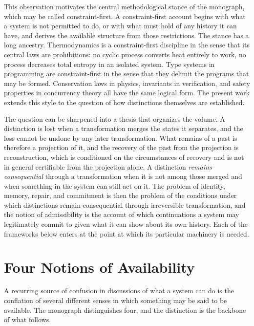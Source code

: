 \documentclass[11pt,twoside,openright]{book}
\theoremstyle{plain}
\theoremstyle{definition}
\theoremstyle{remark}
\begin{document}
This observation motivates the central methodological stance of the monograph, which may be called constraint-first. A constraint-first account begins with what a system is not permitted to do, or with what must hold of any history it can have, and derives the available structure from those restrictions. The stance has a long ancestry. Thermodynamics is a constraint-first discipline in the sense that its central laws are prohibitions: no cyclic process converts heat entirely to work, no process decreases total entropy in an isolated system. Type systems in programming are constraint-first in the sense that they delimit the programs that may be formed. Conservation laws in physics, invariants in verification, and safety properties in concurrency theory all have the same logical form. The present work extends this style to the question of how distinctions themselves are established.

The question can be sharpened into a thesis that organizes the volume. A distinction is lost when a transformation merges the states it separates, and the loss cannot be undone by any later transformation. What remains of a past is therefore a projection of it, and the recovery of the past from the projection is reconstruction, which is conditioned on the circumstances of recovery and is not in general certifiable from the projection alone. A distinction \emph{remains consequential} through a transformation when it is not among those merged and when something in the system can still act on it. The problem of identity, memory, repair, and commitment is then the problem of the conditions under which distinctions remain consequential through irreversible transformation, and the notion of admissibility is the account of which continuations a system may legitimately commit to given what it can show about its own history. Each of the frameworks below enters at the point at which its particular machinery is needed.

\section{Four Notions of Availability}

A recurring source of confusion in discussions of what a system can do is the conflation of several different senses in which something may be said to be available. The monograph distinguishes four, and the distinction is the backbone of what follows.
\end{document}
